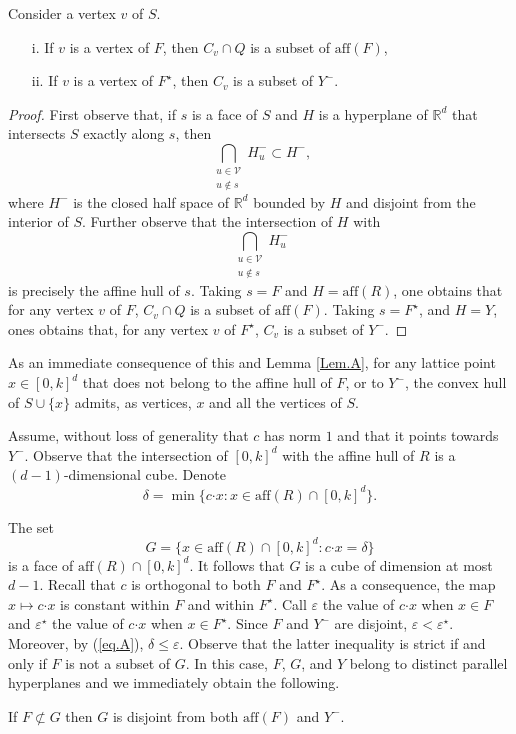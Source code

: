 \begin{lemma}\label{Lem.B}
Consider a vertex $v$ of $S$.
\begin{itemize}
\item[i.] If $v$ is a vertex of $F$, then $C_v\cap{Q}$ is a subset of $\mathrm{aff}(F)$,
\item[ii.] If $v$ is a vertex of $F^\star$, then $C_v$ is a subset of $Y^-$.
\end{itemize}
\end{lemma}

\begin{proof}
First observe that, if $s$ is a face of $S$ and $H$ is a hyperplane of $\mathbb{R}^d$ that intersects $S$ exactly along $s$, then
$$
\bigcap_{\substack{u\in\mathcal{V}\\u\not\in{s}}}H_u^-\subset{H^-}\mbox{,}
$$
where $H^-$ is the closed half space of $\mathbb{R}^d$ bounded by $H$ and disjoint from the interior of $S$. Further observe that the intersection of $H$ with
$$
\bigcap_{\substack{u\in\mathcal{V}\\u\not\in{s}}}H_u^-
$$
is precisely the affine hull of $s$. Taking $s=F$ and $H=\mathrm{aff}(R)$, one obtains that for any vertex $v$ of $F$, $C_v\cap{Q}$ is a subset of $\mathrm{aff}(F)$. Taking $s=F^\star$, and $H=Y$, ones obtains that, for any vertex $v$ of $F^\star$, $C_v$ is a subset of $Y^-$.%
\end{proof}

As an immediate consequence of this and Lemma \ref{Lem.A}, for any lattice point $x\in[0,k]^d$ that does not belong to the affine hull of $F$, or to $Y^-$, the convex hull of $S\cup\{x\}$ admits, as vertices, $x$ and all the vertices of $S$.

Assume, without loss of generality that $c$ has norm $1$ and that it points towards $Y^-$. Observe that the intersection of $[0,k]^d$ with the affine hull of $R$ is a $(d-1)$-dimensional cube. Denote
\begin{equation}\label{eq.A}
\delta=\min\{c\mathord{\cdot}x:x\in\mathrm{aff}(R)\cap[0,k]^d\}\mbox{.}
\end{equation}

The set
$$
G=\{x\in\mathrm{aff}(R)\cap[0,k]^d:c\mathord{\cdot}x=\delta\}
$$
is a face of $\mathrm{aff}(R)\cap[0,k]^d$. It follows that $G$ is a cube of dimension at most $d-1$. Recall that $c$ is orthogonal to both $F$ and $F^\star$. As a consequence, the map $x\mapsto{c\mathord{\cdot}x}$ is constant within $F$ and within $F^\star$. Call $\varepsilon$ the value of $c\mathord{\cdot}x$ when $x\in{F}$ and $\varepsilon^\star$ the value of $c\mathord{\cdot}x$ when $x\in{F^\star}$. Since $F$ and $Y^-$ are disjoint, $\varepsilon<\varepsilon^\star$. Moreover, by (\ref{eq.A}), $\delta\leq\varepsilon$. Observe that the latter inequality is strict if and only if $F$ is not a subset of $G$. In this case, $F$, $G$, and $Y$ belong to distinct parallel hyperplanes and we immediately obtain the following.
\begin{lemma}\label{Lem.BC}
If $F\not\subset{G}$ then $G$ is disjoint from both $\mathrm{aff}(F)$ and $Y^-$.
\end{lemma}

